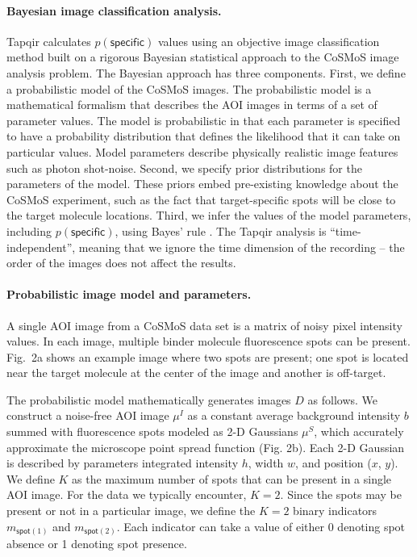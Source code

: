 \paragraph{Bayesian image classification analysis.}
Tapqir calculates $p(\mathsf{specific})$ values using an objective image classification method built on a rigorous Bayesian statistical approach to the CoSMoS image analysis problem. The Bayesian approach has three components. First, we define a probabilistic model of the CoSMoS images. The probabilistic model is a mathematical formalism that describes the AOI images in terms of a set of parameter values.  The model is probabilistic in that each parameter is specified to have a probability distribution that defines the likelihood that it can take on particular values. Model parameters describe physically realistic image features such as photon shot-noise. Second, we specify prior distributions for the parameters of the model. These priors embed pre-existing knowledge about the CoSMoS experiment, such as the fact that target-specific spots will be close to the target molecule locations. Third, we infer the values of the model parameters, including $p(\mathsf{specific})$, using Bayes' rule \cite{Bishop2006-oa}. The Tapqir analysis is “time-independent”, meaning that we ignore the time dimension of the recording -- the order of the images does not affect the results. 

\paragraph{Probabilistic image model and parameters.} %
A single AOI image from a CoSMoS data set is a matrix of noisy pixel intensity values.  In each image, multiple binder molecule fluorescence spots can be present. Fig.~2a shows an example image where two spots are present; one spot is located near the target molecule at the center of the image and another is off-target. 

The probabilistic model mathematically generates images $D$ as follows.  We construct a noise-free AOI image $\mu^I$ as a constant average background intensity $b$ summed with fluorescence spots modeled as 2-D Gaussians $\mu^S$, which accurately approximate the microscope point spread function \cite{Zhang2007-rb} (Fig. 2b). Each 2-D Gaussian is described by parameters integrated intensity $h$, width $w$, and position ($x$, $y$). We define $K$ as the maximum number of spots that can be present in a single AOI image.  For the data we typically encounter, $K = 2$. Since the spots may be present or not in a particular image, we define the $K = 2$ binary indicators $m_{\mathsf{spot}(1)}$ and $m_{\mathsf{spot}(2)}$.  Each indicator can take a value of either 0 denoting spot absence or 1 denoting spot presence. 

